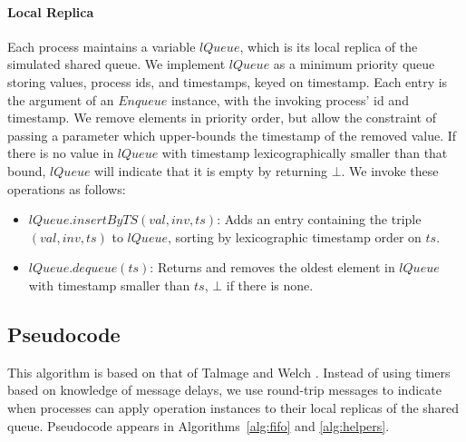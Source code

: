\documentclass[a4paper,anonymous,USenglish]{lipics-v2021}
\theoremstyle{definition}
\begin{document}
\paragraph*{Local Replica}
Each process maintains a variable $lQueue$, which is its local replica of the simulated shared queue.  We implement $lQueue$ as a minimum priority queue storing values, process ids, and timestamps, keyed on timestamp.  Each entry is the argument of an $Enqueue$ instance, with the invoking process' id and timestamp.  We remove elements in priority order, but allow the constraint of passing a parameter which upper-bounds the timestamp of the removed value.  If there is no value in $lQueue$ with timestamp lexicographically smaller than that bound, $lQueue$ will indicate that it is empty by returning $\bot$.  We invoke these operations as follows:
\begin{itemize}
\item $lQueue.insertByTS(val, inv, ts)$: Adds an entry containing the triple $(val, inv, ts)$ to $lQueue$, sorting by lexicographic timestamp order on $ts$.
\item $lQueue.dequeue(ts)$: Returns and removes the oldest element in $lQueue$ with timestamp smaller than $ts$, $\bot$ if there is none.
\end{itemize}


\subsection{Pseudocode}

This algorithm is based on that of Talmage and Welch \cite{TalmageWelch14}.  Instead of using timers based on knowledge of message delays, we use round-trip messages to indicate when processes can apply operation instances to their local replicas of the shared queue.  Pseudocode appears in Algorithms~\ref{alg:fifo} and \ref{alg:helpers}.
\end{document}
